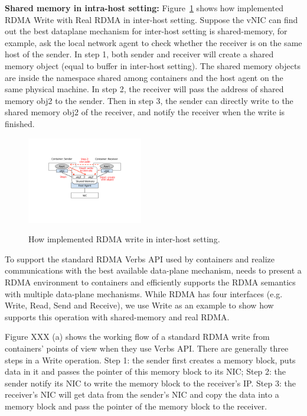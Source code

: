\textbf{Shared memory in intra-host setting:} Figure~\ref{fig:sys_rdma_shm} shows 
how \sysname implemented RDMA Write with Real RDMA in inter-host setting.
Suppose the vNIC can find out the best dataplane mechanism for inter-host setting
is shared-memory, for example, ask the local network agent to check whether the 
receiver is on the same host of the sender.
 In step 1, both sender and receiver will create a shared memory object (equal 
to buffer in inter-host setting). The shared memory objects are inside the namespace
shared among containers and the host agent on the same physical machine.
In step 2, the receiver will pass the address of shared memory obj2 to the sender.
Then in step 3, the sender can directly write to the shared memory obj2 of the
receiver, and notify the receiver when the write is finished.

     \begin{figure}[ht]
     \centering 
     \includegraphics[width=0.45\textwidth]{figures/system/sys_rdma_shm.pdf}      
     \label{fig:sys_rdma_shm}
     \caption{How \sysname implemented RDMA write in inter-host setting.} 
     \end{figure}



\iffalse
To support the standard RDMA Verbs API used by containers and realize
communications with the best available data-plane mechanism, \sysname needs
to present a RDMA environment to containers and efficiently supports 
the RDMA semantics with multiple data-plane mechanisms. 
While RDMA has four interfaces (e.g. Write, Read, Send and Receive), we use Write as an example
to show how \sysname supports this operation with shared-memory and real RDMA.



Figure XXX (a) shows the working flow of a standard RDMA write from containers'
points of view when they use Verbs API. There are generally three steps in a 
Write operation. 
Step 1: the sender first creates a memory block, puts data in it and passes 
the pointer of this memory block to its NIC;
Step 2: the sender notify its NIC to write the memory block to the receiver's IP.
Step 3: the receiver's NIC will get data from the sender's NIC and copy the 
data into a memory block and pass the pointer of the memory block to the 
receiver.

